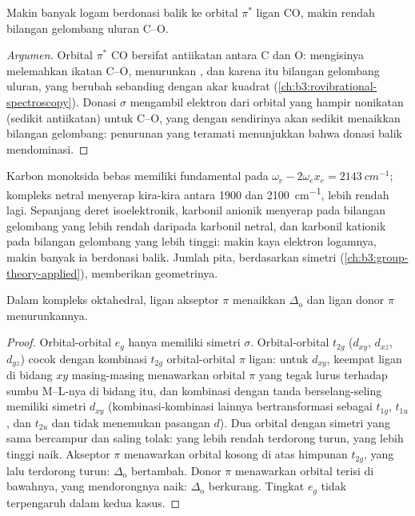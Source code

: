 \begin{proposition}\label{prop:b3:organometallic-bonding:co-frequency}
Makin banyak logam berdonasi balik ke orbital $\pi^*$ ligan CO, makin rendah
bilangan gelombang uluran C--O.
\end{proposition}

\begin{proof}[Argumen]
Orbital $\pi^*$ CO bersifat antiikatan antara C dan O: mengisinya melemahkan ikatan
C--O, menurunkan , dan karena itu bilangan gelombang uluran, yang
berubah sebanding dengan akar kuadrat  (\cref{ch:b3:rovibrational-spectroscopy}).
Donasi $\sigma$ mengambil elektron dari orbital yang hampir nonikatan (sedikit
antiikatan) untuk C--O, yang dengan sendirinya akan sedikit menaikkan bilangan gelombang: penurunan
yang teramati menunjukkan bahwa donasi balik mendominasi.
\end{proof}

Karbon monoksida bebas memiliki fundamental pada $\omega_e - 2\omega_ex_e = \qty{2143}{cm^{-1}}$;  kompleks netral menyerap kira-kira antara 1900 dan \qty{2100}{cm^{-1}},
 lebih rendah lagi. Sepanjang deret isoelektronik, karbonil
anionik menyerap pada bilangan gelombang yang lebih rendah daripada karbonil netral, dan karbonil kationik pada
bilangan gelombang yang lebih tinggi: makin kaya elektron logamnya, makin banyak ia berdonasi balik. Jumlah
pita, berdasarkan simetri (\cref{ch:b3:group-theory-applied}), memberikan geometrinya.

\begin{proposition}\label{prop:b3:organometallic-bonding:pi-delta}
Dalam kompleks oktahedral, ligan akseptor $\pi$ menaikkan $\Delta_{\mathrm o}$ dan ligan donor $\pi$
menurunkannya.
\end{proposition}

\begin{proof}
Orbital-orbital $e_g$ hanya memiliki simetri $\sigma$. Orbital-orbital $t_{2g}$ ($d_{xy}$, $d_{xz}$, $d_{yz}$) cocok dengan kombinasi $t_{2g}$
orbital-orbital $\pi$ ligan: untuk $d_{xy}$, keempat ligan di bidang $xy$ masing-masing
menawarkan orbital $\pi$ yang tegak lurus terhadap sumbu M--L-nya di bidang itu, dan
kombinasi dengan tanda berselang-seling memiliki simetri $d_{xy}$ (kombinasi-kombinasi
lainnya bertransformasi sebagai $t_{1g}$, $t_{1u}$, dan $t_{2u}$ dan tidak menemukan pasangan $d$). Dua orbital dengan
simetri yang sama bercampur dan saling tolak: yang lebih rendah terdorong turun, yang lebih tinggi naik. Akseptor
$\pi$ menawarkan orbital kosong di atas himpunan $t_{2g}$, yang lalu terdorong turun: $\Delta_{\mathrm o}$
bertambah. Donor $\pi$ menawarkan orbital terisi di bawahnya, yang mendorongnya naik: $\Delta_{\mathrm o}$
berkurang. Tingkat $e_g$ tidak terpengaruh dalam kedua kasus.
\end{proof}

